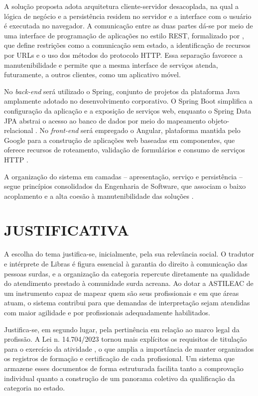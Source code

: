 \documentclass[
        oneside,      %
        english,			
        brazil			 
        ]{abntspiifac}
\begin{document}
A solução proposta adota arquitetura cliente-servidor desacoplada, na qual a lógica de negócio e a persistência residem no servidor e a interface com o usuário é executada no navegador. A comunicação entre as duas partes dá-se por meio de uma interface de programação de aplicações no estilo REST, formalizado por \citet{fielding2000rest}, que define restrições como a comunicação sem estado, a identificação de recursos por URLs e o uso dos métodos do protocolo HTTP. Essa separação favorece a manutenibilidade e permite que a mesma interface de serviços atenda, futuramente, a outros clientes, como um aplicativo móvel.

No \textit{back-end} será utilizado o Spring, conjunto de projetos da plataforma Java amplamente adotado no desenvolvimento corporativo. O Spring Boot simplifica a configuração da aplicação e a exposição de serviços web, enquanto o Spring Data JPA abstrai o acesso ao banco de dados por meio do mapeamento objeto-relacional \citep{walls2022spring,pivotal2026spring}. No \textit{front-end} será empregado o Angular, plataforma mantida pelo Google para a construção de aplicações web baseadas em componentes, que oferece recursos de roteamento, validação de formulários e consumo de serviços HTTP \citep{google2026angular}.

A organização do sistema em camadas -- apresentação, serviço e persistência -- segue princípios consolidados da Engenharia de Software, que associam o baixo acoplamento e a alta coesão à manutenibilidade das soluções \citep{sommerville2019engenharia,pressman2016engenharia}.


\chapter{JUSTIFICATIVA}

A escolha do tema justifica-se, inicialmente, pela sua relevância social. O tradutor e intérprete de Libras é figura essencial à garantia do direito à comunicação das pessoas surdas, e a organização da categoria repercute diretamente na qualidade do atendimento prestado à comunidade surda acreana. Ao dotar a ASTILEAC de um instrumento capaz de mapear quem são seus profissionais e em que áreas atuam, o sistema contribui para que demandas de interpretação sejam atendidas com maior agilidade e por profissionais adequadamente habilitados.

Justifica-se, em segundo lugar, pela pertinência em relação ao marco legal da profissão. A Lei n. 14.704/2023 tornou mais explícitos os requisitos de titulação para o exercício da atividade \citep{brasil2023lei14704}, o que amplia a importância de manter organizados os registros de formação e certificação de cada profissional. Um sistema que armazene esses documentos de forma estruturada facilita tanto a comprovação individual quanto a construção de um panorama coletivo da qualificação da categoria no estado.
\end{document}
